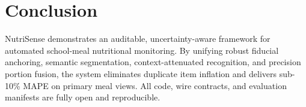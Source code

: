 \documentclass[conference]{IEEEtran}
\begin{document}
\section{Conclusion}
NutriSense demonstrates an auditable, uncertainty-aware framework for automated school-meal nutritional monitoring. By unifying robust fiducial anchoring, semantic segmentation, context-attenuated recognition, and precision portion fusion, the system eliminates duplicate item inflation and delivers sub-10\% MAPE on primary meal views. All code, wire contracts, and evaluation manifests are fully open and reproducible.



\end{document}
